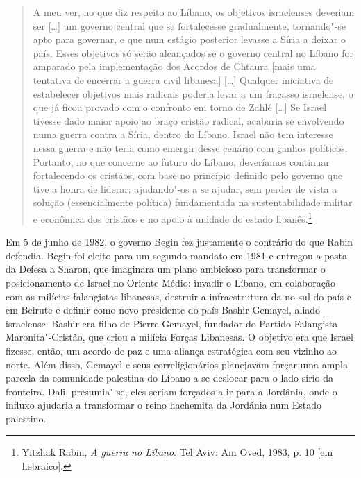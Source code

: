 \begin{quote}
A meu ver, no que diz respeito ao Líbano, os objetivos israelenses
deveriam ser {[}\ldots{}{]} um governo central que se fortalecesse gradualmente,
tornando"-se apto para governar, e que num estágio posterior levasse a Síria
a deixar o país. Esses objetivos só serão alcançados se o governo
central no Líbano for amparado pela implementação dos Acordos de Chtaura
{[}mais uma tentativa de encerrar a guerra civil libanesa{]} {[}\ldots{}{]}
Qualquer iniciativa de estabelecer objetivos mais radicais poderia levar
a um fracasso israelense, o que já ficou provado com o confronto em
torno de Zahlé {[}\ldots{}{]} Se Israel tivesse dado maior apoio ao braço cristão
radical, acabaria se envolvendo numa guerra contra a Síria, dentro do
Líbano. Israel não tem interesse nessa guerra e não teria como emergir
desse cenário com ganhos políticos. Portanto, no que concerne ao futuro
do Líbano, deveríamos continuar fortalecendo os cristãos, com base no
princípio definido pelo governo que tive a honra de liderar: ajudando"-os
a se ajudar, sem perder de vista a solução (essencialmente política)
fundamentada na sustentabilidade militar e econômica dos cristãos e no
apoio à unidade do estado libanês.\footnote{Yitzhak Rabin, \emph{A guerra no
Líbano}. Tel Aviv: Am Oved, 1983, p. 10 {[}em hebraico{]}.}
\end{quote}

Em 5 de junho de 1982, o governo Begin fez justamente o contrário do
que Rabin defendia. Begin foi eleito para um segundo
mandato em 1981 e entregou a pasta da Defesa a Sharon, que imaginara
um plano ambicioso para transformar o posicionamento de Israel
no Oriente Médio: invadir o Líbano, em colaboração com as milícias
falangistas libanesas, destruir a infraestrutura da  no sul do país e
em Beirute e definir como novo presidente do país Bashir Gemayel, aliado
israelense. Bashir era filho de Pierre Gemayel, fundador do Partido
Falangista Maronita"-Cristão, que criou a milícia Forças Libanesas. O
objetivo era que Israel fizesse, então, um acordo de paz e uma aliança
estratégica com seu vizinho ao norte. Além disso, Gemayel e seus
correligionários planejavam forçar uma ampla parcela da comunidade
palestina do Líbano a se deslocar para o lado sírio da fronteira. Dali,
presumia"-se, eles seriam forçados a ir para a Jordânia, onde o influxo
ajudaria a transformar o reino hachemita da Jordânia num Estado
palestino.

